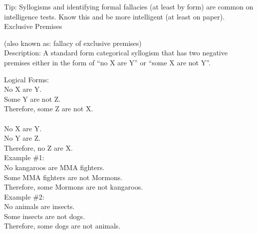 \documentclass[a4paper,12pt,single,pdftex]{scrartcl}
\begin{document}
    
      Tip: Syllogisms and identifying formal fallacies (at least by form) are common on intelligence tests. Know this and be more intelligent (at least on paper).
    \\

  

Exclusive Premises
    
      (also known as: fallacy of exclusive premises)
    \\

  
    Description: A standard form categorical syllogism that has two negative premises either in the form of  “no X are Y” or “some X are not Y”.

    
      Logical Forms:
    \\

    
      No X are Y.
    \\

    
      Some Y are not Z.
    \\

    
      Therefore, some Z are not X.
    \\

    
       
    \\

    
      No X are Y.
    \\

    
      No Y are Z.
    \\

    
      Therefore, no Z are X.
    \\

    
      Example \#1:
    \\

    
      No kangaroos are MMA fighters.
    \\

    
      Some MMA fighters are not Mormons.
    \\

    
      Therefore, some Mormons are not kangaroos.
    \\

    
      Example \#2:
    \\

    
      No animals are insects.
    \\

    
      Some insects are not dogs.
    \\

    
      Therefore, some dogs are not animals.
    \\
\end{document}
